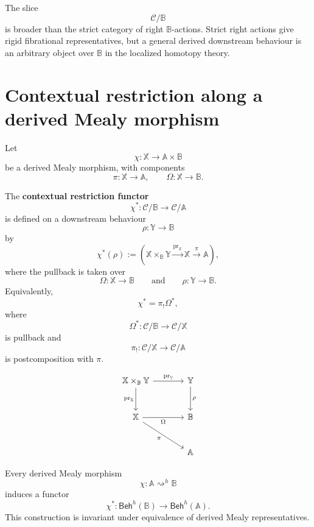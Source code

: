\begin{remark}
\label{rem:derived-behaviours-broader-than-actions}
The slice
\[
\mathcal C/\mathbb B
\]
is broader than the strict category of right \(\mathbb B\)-actions. Strict
right actions give rigid fibrational representatives, but a general derived
downstream behaviour is an arbitrary object over \(\mathbb B\) in the
localized homotopy theory.
\end{remark}

\section{Contextual restriction along a derived Mealy morphism}
\label{sec:contextual-restriction-derived-mealy}

Let
\[
\chi:\mathbb X\to\mathbb A\times\mathbb B
\]
be a derived Mealy morphism, with components
\[
\pi:\mathbb X\to\mathbb A,
\qquad
\Omega:\mathbb X\to\mathbb B.
\]

\begin{definition}
\label{def:contextual-restriction-derived}
The \textbf{contextual restriction functor}
\[
\chi^\ast:
\mathcal C/\mathbb B
\longrightarrow
\mathcal C/\mathbb A
\]
is defined on a downstream behaviour
\[
\rho:\mathbb Y\to\mathbb B
\]
by
\[
\chi^\ast(\rho)
:=
\left(
\mathbb X\times_{\mathbb B}\mathbb Y
\xrightarrow{\operatorname{pr}_{\mathbb X}}
\mathbb X
\xrightarrow{\pi}
\mathbb A
\right),
\]
where the pullback is taken over
\[
\Omega:\mathbb X\to\mathbb B
\qquad
\text{and}
\qquad
\rho:\mathbb Y\to\mathbb B.
\]
Equivalently,
\[
\chi^\ast
=
\pi_!\Omega^\ast,
\]
where
\[
\Omega^\ast:\mathcal C/\mathbb B\to\mathcal C/\mathbb X
\]
is pullback and
\[
\pi_!:\mathcal C/\mathbb X\to\mathcal C/\mathbb A
\]
is postcomposition with \(\pi\).
\end{definition}

\[
\begin{tikzcd}[column sep=large, row sep=large]
\mathbb X\times_{\mathbb B}\mathbb Y
\arrow[r, "\operatorname{pr}_{\mathbb Y}"]
\arrow[d, "\operatorname{pr}_{\mathbb X}"']
&
\mathbb Y
\arrow[d, "\rho"]
\\
\mathbb X
\arrow[r, "\Omega"']
\arrow[dr, "\pi"']
&
\mathbb B
\\
&
\mathbb A
\end{tikzcd}
\]

\begin{theorem}
\label{thm:derived-contextual-restriction}
Every derived Mealy morphism
\[
\chi:\mathbb A\rightsquigarrow^h\mathbb B
\]
induces a functor
\[
\chi^\ast:
\mathsf{Beh}^h(\mathbb B)\to\mathsf{Beh}^h(\mathbb A).
\]
This construction is invariant under equivalence of derived Mealy
representatives.
\end{theorem}

